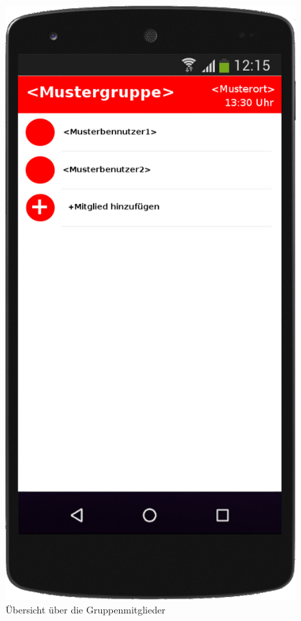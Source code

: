 \begin{figure}
	\includegraphics[scale=0.2]{resources/images/handy/gruppendetails_admin.png}
	\caption{Übersicht über die Gruppenmitglieder}
\end{figure}

